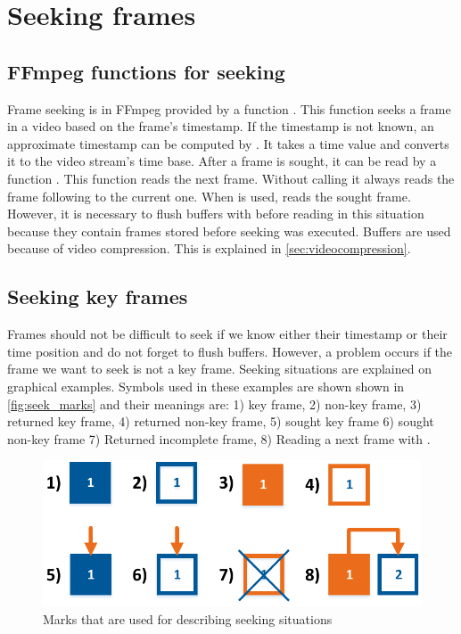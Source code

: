 \section{Seeking frames}\label{sec:seeking}
\subsection{FFmpeg functions for seeking}
Frame seeking is in FFmpeg provided by a function . This function seeks a frame in a video based on the frame’s timestamp. If the timestamp is not known, an approximate timestamp can be computed by . It takes a time value and converts it to the video stream’s time base. After a frame is sought, it can be read by a function . This function reads the next frame. Without calling  it always reads the frame following to the current one. When  is used,  reads the sought frame. However, it is necessary to flush buffers with  before reading in this situation because they contain frames stored before seeking was executed. Buffers are used because of video compression. This is explained in \autoref{sec:videocompression}.

\subsection{Seeking key frames}
Frames should not be difficult to seek if we know either their timestamp or their time position and do not forget to flush buffers. However, a problem occurs if the frame we want to seek is not a key frame. Seeking situations are explained on graphical examples. Symbols used in these examples are shown shown in \autoref{fig:seek_marks} and their meanings are: 1) key frame, 2) non-key frame, 3) returned key frame, 4) returned non-key frame, 5) sought key frame 6) sought non-key frame 7) Returned incomplete frame, 8) Reading a next frame with .
\begin{figure}[!htbp]
\centering
\includegraphics[scale=0.6]{fig/seeking_marks}
\caption{Marks that are used for describing seeking situations}
\label{fig:seek_marks}
\end{figure}


